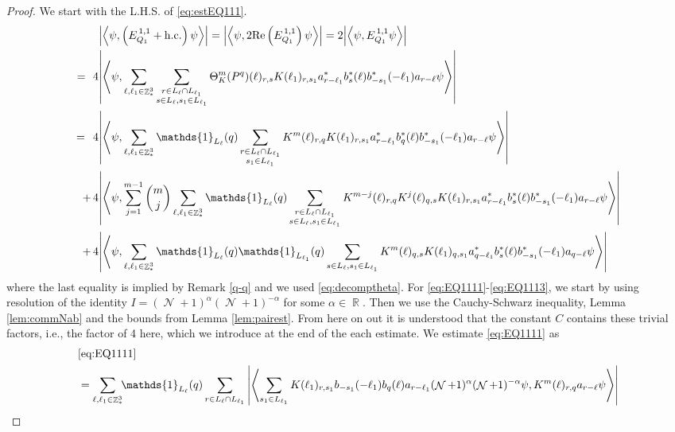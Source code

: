 \documentclass[sn-mathphys, Numbered ,a4paper]{sn-jnl}%
\DeclareMathOperator{\R}{\mathbb{R}}
\DeclareMathOperator{\Z}{\mathbb{Z}}
\DeclareMathOperator{\NN}{\mathcal{N}}
\newcommand{\eva}[1]{\left\langle #1 \right\rangle}
\theoremstyle{plain}
\theoremstyle{definition}
\theoremstyle{remark}
\theoremstyle{plain}
\theoremstyle{definition}
\theoremstyle{remark}
\begin{document}
\begin{proof}We start with the L.H.S. of \eqref{eq:estEQ111}.
\begin{align}
	&\abs{\eva{\psi,\left(E^{\,1,1}_{Q_1}+\mathrm{h.c.}\right) \psi }} = \abs{\eva{\psi,2\mathrm{Re}\left(E^{\,1,1}_{Q_1}\right) \psi }} = 2\abs{\eva{\psi, E^{\,1,1}_{Q_1} \psi }}\nonumber\\
	=\,\:4&\abs{\eva{\psi, \sum\limits_{\ell, \ell_1\in \Z^3_*}\sum\limits_{\substack{r\in L_{\ell} \cap L_{\ell_1}\\  s \in L_{\ell}, s_1\in L_{\ell_1}}} \Theta^m_{K}(P^q)(\ell)_{r,s} K(\ell_1)_{r,s_1} a^*_{r-\ell_1} b^*_{s}(\ell) b^*_{-s_1}(-\ell_1) a_{r-\ell} \psi }} \nonumber\\
	=\,\;4& \abs{\eva{\psi,\sum\limits_{\ell, \ell_1\in \Z^3_*} \mathds{1}_{L_{\ell}}(q) \sum\limits_{\substack{r\in L_{\ell} \cap L_{\ell_1}\\s_1\in L_{\ell_1}}} K^m(\ell )_{r,q} K(\ell_1)_{r,s_1} a^*_{r-\ell_1} b^*_{q}(\ell) b^*_{-s_1}(-\ell_1) a_{r-\ell} \psi }}\label{eq:EQ1111}\\
	+\,4&   \abs{\eva{\psi, \sum\limits_{j=1}^{m-1} {{m}\choose j} \sum\limits_{\ell, \ell_1\in \Z^3_*}\mathds{1}_{L_{\ell}}(q) \sum\limits_{\substack{r\in L_{\ell} \cap L_{\ell_1}\\ s \in L_{\ell},s_1\in L_{\ell_1}}} K^{m-j}(\ell)_{r,q} K^{j}(\ell)_{q,s} K(\ell_1)_{r,s_1} a^*_{r-\ell_1} b^*_{s}(\ell) b^*_{-s_1}(-\ell_1) a_{r-\ell} \psi }}\label{eq:EQ1112}\\
	+\,4& \abs{\eva{\psi, \sum\limits_{\ell, \ell_1\in \Z^3_*} \mathds{1}_{L_{\ell}}(q) \mathds{1}_{L_{\ell_1}}(q) \sum\limits_{s \in L_{\ell},s_1\in L_{\ell_1}} K^m(\ell)_{q,s}K(\ell_1)_{q,s_1}
	a^*_{q-\ell_1}b^*_{s}(\ell) b^*_{-s_1}(-\ell_1)a_{q-\ell} \psi }}\label{eq:EQ1113}
\end{align}
where the last equality is implied by Remark \ref{q-q} and we used \eqref{eq:decomptheta}.
For \eqref{eq:EQ1111}-\eqref{eq:EQ1113}, we start by using resolution of the identity $I = (\NN+1)^{\alpha}(\NN+1)^{-\alpha}$ for some $\alpha \in \R$. Then we use the Cauchy-Schwarz inequality, Lemma \ref{lem:commNab} and the bounds from Lemma \ref{lem:pairest}.  From here on out it is understood that the constant $C$ contains these trivial factors, i.e., the factor of 4 here, which we introduce at the end of the each estimate. We estimate \eqref{eq:EQ1111} as 
\begin{align}
	&\eqref{eq:EQ1111}\nonumber\\
    &= \sum\limits_{\ell,\ell_1  \in \Z^3_*}\!\! \mathds{1}_{L_\ell}(q) \sum\limits_{r \in L_\ell \cap L_{\ell_1}} \abs{\eva{ \sum\limits_{s_1 \in L_{\ell_1}} K(\ell_1)_{r,s_1} b_{-s_1}(-\ell_1) b_{q}(\ell) a_{r-\ell_1} (\NN+1)^{\alpha} (\NN+1)^{-\alpha} \psi,  K^{m}(\ell)_{r,q} a_{r-\ell} \psi }}\nonumber\\

\end{align}
\end{proof}
\end{document}
